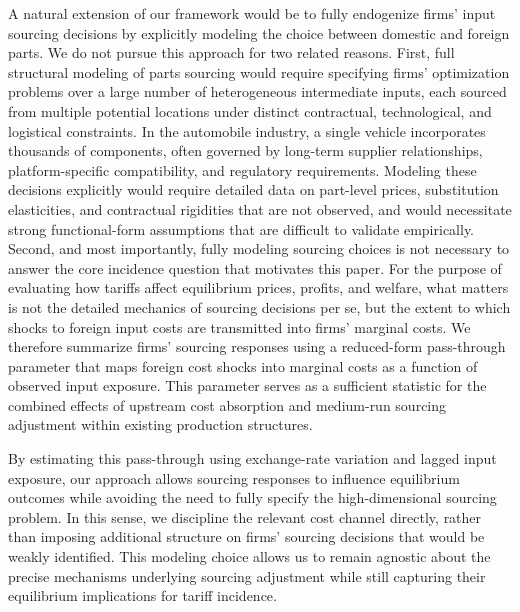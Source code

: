 \documentclass[11pt]{article}
\begin{document}
A natural extension of our framework would be to fully endogenize firms’ input sourcing decisions by explicitly modeling the choice between domestic and foreign parts. We do not pursue this approach for two related reasons. First, full structural modeling of parts sourcing would require specifying firms’ optimization problems over a large number of heterogeneous intermediate inputs, each sourced from multiple potential locations under distinct contractual, technological, and logistical constraints. In the automobile industry, a single vehicle incorporates thousands of components, often governed by long-term supplier relationships, platform-specific compatibility, and regulatory requirements. Modeling these decisions explicitly would require detailed data on part-level prices, substitution elasticities, and contractual rigidities that are not observed, and would necessitate strong functional-form assumptions that are difficult to validate empirically. Second, and most importantly, fully modeling sourcing choices is not necessary to answer the core incidence question that motivates this paper. For the purpose of evaluating how tariffs affect equilibrium prices, profits, and welfare, what matters is not the detailed mechanics of sourcing decisions per se, but the extent to which shocks to foreign input costs are transmitted into firms’ marginal costs. We therefore summarize firms’ sourcing responses using a reduced-form pass-through parameter that maps foreign cost shocks into marginal costs as a function of observed input exposure. This parameter serves as a sufficient statistic for the combined effects of upstream cost absorption and medium-run sourcing adjustment within existing production structures.

By estimating this pass-through using exchange-rate variation and lagged input exposure, our approach allows sourcing responses to influence equilibrium outcomes while avoiding the need to fully specify the high-dimensional sourcing problem. In this sense, we discipline the relevant cost channel directly, rather than imposing additional structure on firms’ sourcing decisions that would be weakly identified. This modeling choice allows us to remain agnostic about the precise mechanisms underlying sourcing adjustment while still capturing their equilibrium implications for tariff incidence.
\end{document}
